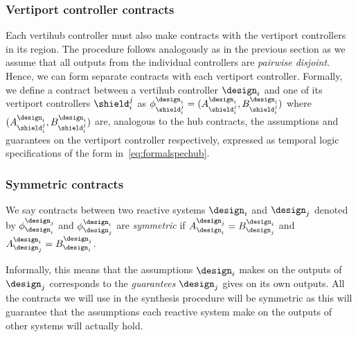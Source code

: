 \subsubsection*{\textbf{Vertiport controller contracts}}
Each vertihub controller must also make contracts with the vertiport controllers in its region. The procedure follows analogously as in the previous section as we assume that all outputs from the individual controllers are \emph{pairwise disjoint}. Hence, we can form separate contracts with each vertiport controller. Formally, we define a contract between a vertihub controller $\design_i$ and one of its vertiport controllers $\shield_i^j$ as $ \phi_{\shield^j_i}^{\design_i} = (A_{\shield_i^j}^{\design_i},B_{\shield_i^j}^{\design_i})$ where $(A_{\shield_i^j}^{\design_i},B_{\shield_i^j}^{\design_i})$ are, analogous to the hub contracts, the assumptions and guarantees on the vertiport controller respectively, expressed as temporal logic specifications of the form in~\eqref{eq:formalspechub}. 

\subsubsection*{\textbf{Symmetric contracts}}
We say contracts between two reactive systems $\design_i$ and $\design_j$ denoted by $\phi_{\design_i}^{\design_j}  $ and $\phi_{\design_j}^{\design_i}$ are \emph{symmetric} if $A_{\design_i}^{\design_j} = B_{\design_j}^{\design_i}$ and $A_{\design_j}^{\design_i} = B_{\design_i}^{\design_j}$. 

Informally, this means that the assumptions $\design_i$ makes on the outputs of $\design_j$ corresponds to the \emph{guarantees} $\design_j$ gives on its own outputs. All the contracts we will use in the synthesis procedure will be symmetric as this will guarantee that the assumptions each reactive system make on the outputs of other systems will actually hold. 

